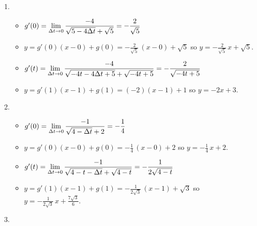 \begin{enumerate}
\setcounter{enumi}{\value{HW}}

\item \begin{itemize}

\item  $g'(0) = \displaystyle{ \lim_{\Delta t \rightarrow 0} \dfrac{-4}{\sqrt{5-4\Delta t} + \sqrt{5}}  = - \dfrac{2}{\sqrt{5}}}$

\smallskip

\item  $y = g'(0) (x - 0) + g(0) =  -\frac{2}{\sqrt{5}} \, (x-0) + \sqrt{5}$ so $y = -\frac{2}{\sqrt{5}} \, x + \sqrt{5}$.

\smallskip

\item  $g'(t) =  \displaystyle{ \lim_{\Delta t \rightarrow 0} \dfrac{-4}{\sqrt{-4t-4\Delta t+5} + \sqrt{-4t+5}} =   -\dfrac{2}{\sqrt{-4t+5}}}$

\smallskip

\item  $y = g'(1)(x-1)+g(1) = (-2)(x-1) + 1$ so $y = -2x+3$.

\smallskip

\end{itemize}

\item   \begin{itemize}

\item  $g'(0) = \displaystyle{ \lim_{\Delta t \rightarrow 0} \dfrac{-1}{\sqrt{4-\Delta t} + 2}  = - \dfrac{1}{4}}$

\smallskip

\item  $y = g'(0) (x - 0) + g(0) =  -\frac{1}{4} \, (x-0) + 2$ so $y = -\frac{1}{4} \, x +2$.

\smallskip

\item  $g'(t) = \displaystyle{ \lim_{\Delta t \rightarrow 0} \dfrac{-1}{\sqrt{4-t-\Delta t} + \sqrt{4-t}} = -\dfrac{1}{2 \sqrt{4-t}} }$  

\smallskip

\item  $y = g'(1)(x-1)+g(1) = -\frac{1}{2 \sqrt{3}} \, (x-1) + \sqrt{3}$ so $y =  -\frac{1}{2 \sqrt{3}}  \, x + \frac{7 \sqrt{3}}{6}$.

\smallskip

\end{itemize}


\item   \begin{enumerate}


\end{enumerate}
\end{enumerate}
